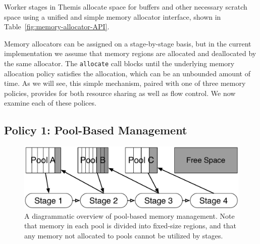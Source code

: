 Worker stages in Themis allocate space for buffers and other necessary
scratch space using a unified and simple memory allocator interface,
shown in Table~\ref{fig:memory-allocator-API}.

\begin{table}
  \centering
  \caption{\label{fig:memory-allocator-API} A summary of the Themis memory
    allocator API}
\end{table}

Memory allocators can be assigned on a stage-by-stage basis, but in the current
implementation we assume that memory regions are allocated and deallocated by
the same allocator.  The \texttt{allocate} call blocks until the underlying
memory allocation policy satisfies the allocation, which can be an unbounded
amount of time.  As we will see, this simple mechanism, paired with one of
three memory policies, provides for both resource sharing as well as flow
control.  We now examine each of these polices.

\subsection{Policy 1: Pool-Based Management}

\begin{figure}
  \centering
  \includegraphics[width=\columnwidth]{themis/figures/pool_based_manager.pdf}
  \caption{\label{fig:memory_allocators:pool} A diagrammatic overview of
    pool-based memory management. Note that memory in each pool is divided into
  fixed-size regions, and that any memory not allocated to pools cannot be
  utilized by stages.}
\end{figure}

